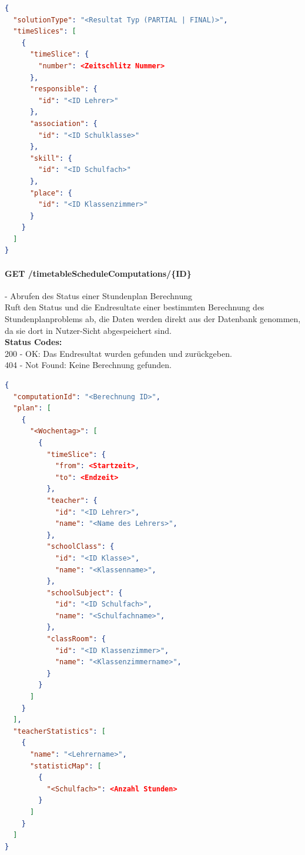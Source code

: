 \begin{lstlisting}[language=JSON, caption=Beispiel eines Resultates für das Stundenplanproblem aus Algorithmus-Sicht, label=lst:solution_timetableScheduling_algo]  
{
  "solutionType": "<Resultat Typ (PARTIAL | FINAL)>",
  "timeSlices": [
    {
      "timeSlice": {
        "number": <Zeitschlitz Nummer>
      },
      "responsible": {
        "id": "<ID Lehrer>"
      },
      "association": {
        "id": "<ID Schulklasse>"
      },
      "skill": {
        "id": "<ID Schulfach>"
      },
      "place": {
        "id": "<ID Klassenzimmer>"
      }
    }
  ]
}
\end{lstlisting}

\paragraph{GET /timetableScheduleComputations/\{ID\}} - Abrufen des Status einer Stundenplan Berechnung\mbox{}\\
Ruft den Status und die Endresultate einer bestimmten Berechnung des Stundenplanproblems ab, die Daten werden direkt aus der Datenbank genommen, da sie dort in Nutzer-Sicht abgespeichert sind.\\
\textbf{Status Codes:}\\
200 - OK: Das Endresultat wurden gefunden und zurückgeben.\\
404 - Not Found: Keine Berechnung gefunden.\\

\begin{lstlisting}[language=JSON, caption=Beispiel eines Endresultates für das Stundenplanproblem, label=lst:solution_timetableScheduling]  
{
  "computationId": "<Berechnung ID>",
  "plan": [
    {
      "<Wochentag>": [
        {
          "timeSlice": {
            "from": <Startzeit>,
            "to": <Endzeit>
          },
          "teacher": {
            "id": "<ID Lehrer>",
            "name": "<Name des Lehrers>",
          },
          "schoolClass": {
            "id": "<ID Klasse>",
            "name": "<Klassenname>",
          },
          "schoolSubject": {
            "id": "<ID Schulfach>",
            "name": "<Schulfachname>",
          },
          "classRoom": {
            "id": "<ID Klassenzimmer>",
            "name": "<Klassenzimmername>",
          }
        }
      ]
    }
  ],
  "teacherStatistics": [
    {
      "name": "<Lehrername>",
      "statisticMap": [
        {
          "<Schulfach>": <Anzahl Stunden>
        }
      ]
    }
  ]
}
\end{lstlisting}


